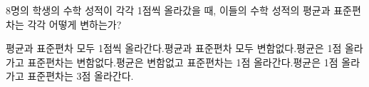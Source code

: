 8명의 학생의 수학 성적이 각각 1점씩 올라갔을 때, 이들의 수학 성적의 평균과 표준편차는 각각 어떻게 변하는가?
\begin{choicesv}{평균과 표준편차 모두 1점씩 올라간다.}{평균과 표준편차 모두 변함없다.}{평균은 1점 올라가고 표준편차는 변함없다.}{평균은 변함없고 표준편차는 1점 올라간다.}{평균은 1점 올라가고 표준편차는 3점 올라간다.}\end{choicesv}
